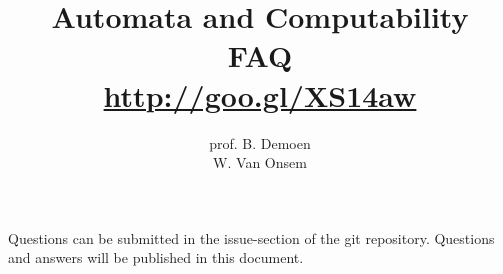 \documentclass{article}
\title{Automata and Computability\\FAQ\\\url{http://goo.gl/XS14aw}}
\author{prof. B. Demoen\\W. Van Onsem}
\date{}
\begin{document}
\maketitle
Questions can be submitted in the issue-section of the git repository. Questions and answers will be published in this document.
\end{document}
